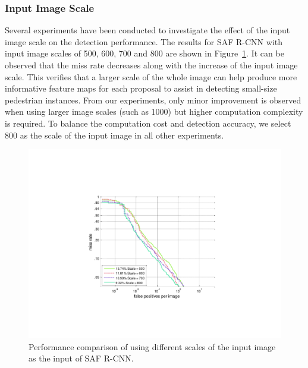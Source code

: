\documentclass[journal]{IEEEtran}
\begin{document}


\subsubsection{Input Image Scale} 
Several experiments have been conducted to investigate the effect of the input image scale on the detection performance. The results for SAF R-CNN with input image scales of 500, 600, 700 and 800 are shown in  Figure~\ref{fig:Caltech_Scales}. It can be observed that the miss rate decreases along with the increase of the input image scale. This verifies that a larger scale of the whole image can help produce more informative feature maps for each proposal to assist in detecting small-size pedestrian instances. From our experiments, only minor improvement is observed when using larger image scales (such as 1000) but higher computation complexity is required. To balance the computation cost and detection accuracy, we select $800$ as the scale of the input image in all other experiments. 

\begin{figure}
	\begin{center}
		\includegraphics[scale=0.58]{figures/Caltech_Scales.pdf}
		\caption{{Performance comparison of using different scales of the input image as the input of SAF R-CNN.}}	
		\label{fig:Caltech_Scales}
	\end{center}
	\vspace{-4mm}
\end{figure}
\end{document}
